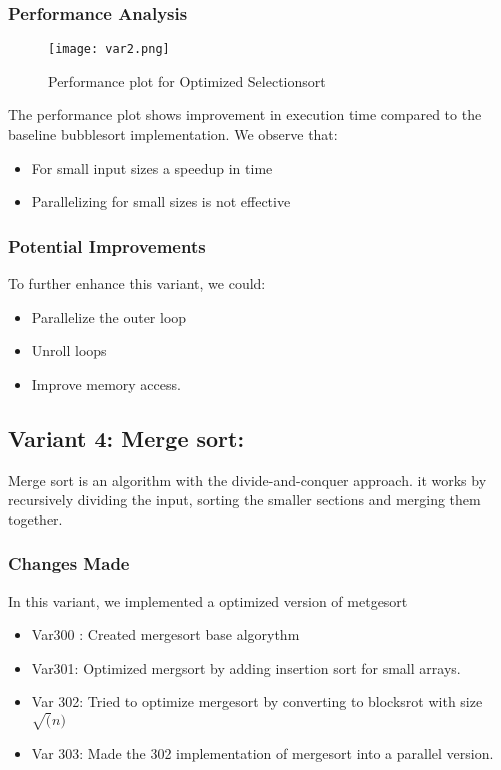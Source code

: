 \documentclass[twocolumn]{article}
\begin{document}
\subsubsection{Performance Analysis}
\begin{figure}[H]
    \centering
    \texttt{[image: var2.png]}
    \caption{Performance plot for Optimized Selectionsort}
    \label{fig:variant3_plot}
\end{figure}

The performance plot shows improvement in execution time compared to the baseline bubblesort  implementation. We observe that:
\begin{itemize}
    \item For small input sizes a speedup in time
    \item Parallelizing for small sizes is not effective
\end{itemize}

\subsubsection{Potential Improvements}
To further enhance this variant, we could:
\begin{itemize}
    \item Parallelize the outer loop
    \item Unroll loops
    \item Improve memory access.
\end{itemize}

\subsection{Variant 4: Merge sort:}

Merge sort is an algorithm with the divide-and-conquer approach. it works by recursively dividing the input, sorting the smaller sections and merging them together.

\subsubsection{Changes Made}
In this variant, we implemented a optimized version of metgesort
\begin{itemize}
    \item Var300 : Created mergesort base algorythm
    \item Var301: Optimized mergsort by adding insertion sort for small arrays.
    \item Var 302: Tried to optimize mergesort by converting to blocksrot with size $\sqrt(n)$
    \item Var 303: Made the 302 implementation of mergesort into a parallel version.
\end{itemize}
\end{document}
